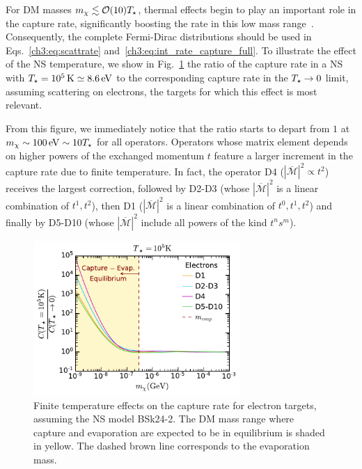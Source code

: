 For DM masses $m_\chi\lesssim \mathcal{O}(10)T_\star$, thermal effects begin to play an important role in the capture rate, significantly boosting the rate in this low mass range~\cite{Garani:2018kkd_may_NewAnalysisNeutron}. Consequently, the complete Fermi-Dirac distributions should be used in Eqs.~\ref{ch3:eq:scattrate} and~\ref{ch3:eq:int_rate_capture_full}. To illustrate the effect of the NS temperature,  we show in Fig.~\ref{ch4:fig:CfiniteT_e} the ratio of the capture rate in a NS with 
$T_\star=10^5{\rm \,K}\simeq8.6{\rm \,eV}$ to the corresponding capture rate in the $T_\star\rightarrow0$ limit, assuming scattering on electrons, the targets for which this effect is most relevant. 

From this figure, we immediately notice that the ratio starts to depart from  $1$ at $m_\chi\sim100{\rm \,eV}\sim 10T_\star$ for all operators. Operators whose matrix element depends on higher powers of the exchanged momentum  $t$ feature a larger increment in the capture rate due to finite temperature. In fact, the operator D4 ($|\overline{\mathcal{M}}|^2\propto t^2$) receives the largest correction, followed by D2-D3 (whose $|\overline{\mathcal{M}}|^2$ is a linear combination of $t^1,t^2$), then D1 ($|\overline{\mathcal{M}}|^2$ is a linear combination of $t^0,t^1,t^2$) and finally by  D5-D10 (whose $|\overline{\mathcal{M}}|^2$ include all powers of the kind $t^n s^m$).

\begin{figure}[t!bp]
    \centering
    \includegraphics[width=0.7\textwidth]{capture_2/R_CT_mdm_10_5K_D1_D10_e.pdf}
    \caption[Finite temperature effects on the capture rate for electron targets, assuming the NS model BSk24-2.]{Finite temperature effects on the capture rate for electron targets, assuming the NS model BSk24-2. The DM mass range where capture and evaporation are expected to be in equilibrium is shaded in yellow. The dashed brown line corresponds to the evaporation mass.}
    \label{ch4:fig:CfiniteT_e}
\end{figure}


